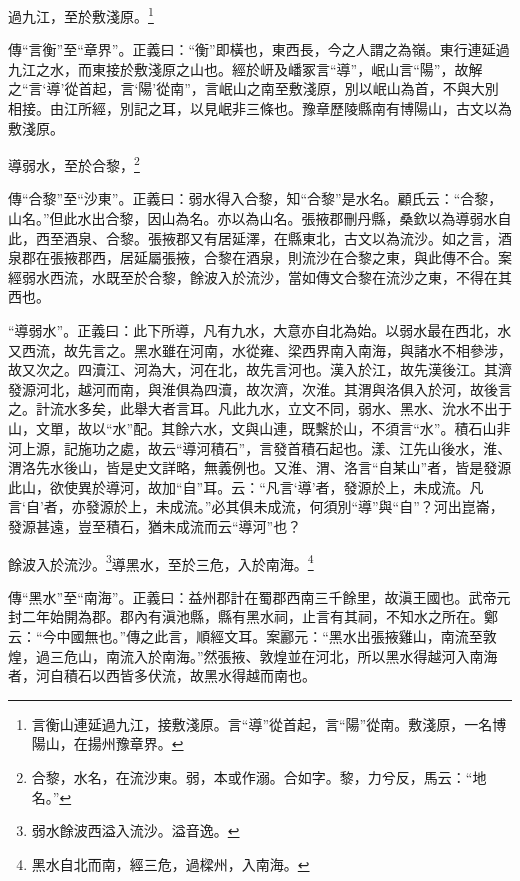 過九江，至於敷淺原。\footnote{言衡山連延過九江，接敷淺原。言“導”從首起，言“陽”從南。敷淺原，一名博陽山，在揚州豫章界。}

{\noindent\zhuan{}\fzbyks 傳“言衡”至“章界”。正義曰：“衡”即橫也，東西長，今之人謂之為嶺。東行連延過九江之水，而東接於敷淺原之山也。經於岍及嶓冢言“導”，岷山言“陽”，故解之“言‘導’從首起，言‘陽’從南”，言岷山之南至敷淺原，別以岷山為首，不與大別相接。由江所經，別記之耳，以見岷非三條也。豫章歷陵縣南有博陽山，古文以為敷淺原。 \par}

導弱水，至於合黎，\footnote{合黎，水名，在流沙東。弱，本或作溺。合如字。黎，力兮反，馬云：“地名。”}

{\noindent\zhuan{}\fzbyks 傳“合黎”至“沙東”。正義曰：弱水得入合黎，知“合黎”是水名。顧氏云：“合黎，山名。”但此水出合黎，因山為名。亦以為山名。張掖郡刪丹縣，桑欽以為導弱水自此，西至酒泉、合黎。張掖郡又有居延澤，在縣東北，古文以為流沙。如之言，酒泉郡在張掖郡西，居延屬張掖，合黎在酒泉，則流沙在合黎之東，與此傳不合。案經弱水西流，水既至於合黎，餘波入於流沙，當如傳文合黎在流沙之東，不得在其西也。 \par}

{\noindent\shu{}\fzkt “導弱水”。正義曰：此下所導，凡有九水，大意亦自北為始。以弱水最在西北，水又西流，故先言之。黑水雖在河南，水從雍、梁西界南入南海，與諸水不相參涉，故又次之。四瀆江、河為大，河在北，故先言河也。漢入於江，故先漢後江。其濟發源河北，越河而南，與淮俱為四瀆，故次濟，次淮。其渭與洛俱入於河，故後言之。計流水多矣，此舉大者言耳。凡此九水，立文不同，弱水、黑水、沇水不出于山，文單，故以“水”配。其餘六水，文與山連，既繫於山，不須言“水”。積石山非河上源，記施功之處，故云“導河積石”，言發首積石起也。漾、江先山後水，淮、渭洛先水後山，皆是史文詳略，無義例也。又淮、渭、洛言“自某山”者，皆是發源此山，欲使異於導河，故加“自”耳。云：“凡言‘導’者，發源於上，未成流。凡言‘自’者，亦發源於上，未成流。”必其俱未成流，何須別“導”與“自”？河出崑崙，發源甚遠，豈至積石，猶未成流而云“導河”也？ \par}

餘波入於流沙。\footnote{弱水餘波西溢入流沙。溢音逸。}導黑水，至於三危，入於南海。\footnote{黑水自北而南，經三危，過樑州，入南海。}

{\noindent\zhuan{}\fzbyks 傳“黑水”至“南海”。正義曰：益州郡計在蜀郡西南三千餘里，故滇王國也。武帝元封二年始開為郡。郡內有滇池縣，縣有黑水祠，止言有其祠，不知水之所在。鄭云：“今中國無也。”傳之此言，順經文耳。案酈元：“黑水出張掖雞山，南流至敦煌，過三危山，南流入於南海。”然張掖、敦煌並在河北，所以黑水得越河入南海者，河自積石以西皆多伏流，故黑水得越而南也。 \par}

